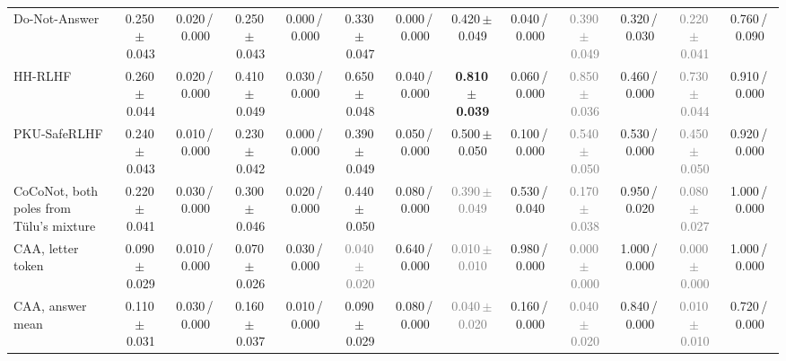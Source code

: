 \begin{tabular}{@{}lcccccccccccc@{}}
Do-Not-Answer & 0.250\,{\scriptsize$\pm$\,0.043} & {\scriptsize 0.020\,/\,0.000} & 0.250\,{\scriptsize$\pm$\,0.043} & {\scriptsize 0.000\,/\,0.000} & 0.330\,{\scriptsize$\pm$\,0.047} & {\scriptsize 0.000\,/\,0.000} & 0.420\,{\scriptsize$\pm$\,0.049} & {\scriptsize 0.040\,/\,0.000} & \textcolor{gray}{0.390\,{\scriptsize$\pm$\,0.049}} & {\scriptsize 0.320\,/\,0.030} & \textcolor{gray}{0.220\,{\scriptsize$\pm$\,0.041}} & {\scriptsize 0.760\,/\,0.090} \\
HH-RLHF & 0.260\,{\scriptsize$\pm$\,0.044} & {\scriptsize 0.020\,/\,0.000} & 0.410\,{\scriptsize$\pm$\,0.049} & {\scriptsize 0.030\,/\,0.000} & 0.650\,{\scriptsize$\pm$\,0.048} & {\scriptsize 0.040\,/\,0.000} & \textbf{0.810\,{\scriptsize$\pm$\,0.039}} & {\scriptsize 0.060\,/\,0.000} & \textcolor{gray}{0.850\,{\scriptsize$\pm$\,0.036}} & {\scriptsize 0.460\,/\,0.000} & \textcolor{gray}{0.730\,{\scriptsize$\pm$\,0.044}} & {\scriptsize 0.910\,/\,0.000} \\
PKU-SafeRLHF & 0.240\,{\scriptsize$\pm$\,0.043} & {\scriptsize 0.010\,/\,0.000} & 0.230\,{\scriptsize$\pm$\,0.042} & {\scriptsize 0.000\,/\,0.000} & 0.390\,{\scriptsize$\pm$\,0.049} & {\scriptsize 0.050\,/\,0.000} & 0.500\,{\scriptsize$\pm$\,0.050} & {\scriptsize 0.100\,/\,0.000} & \textcolor{gray}{0.540\,{\scriptsize$\pm$\,0.050}} & {\scriptsize 0.530\,/\,0.000} & \textcolor{gray}{0.450\,{\scriptsize$\pm$\,0.050}} & {\scriptsize 0.920\,/\,0.000} \\
CoCoNot, both poles from T\"ulu's mixture & 0.220\,{\scriptsize$\pm$\,0.041} & {\scriptsize 0.030\,/\,0.000} & 0.300\,{\scriptsize$\pm$\,0.046} & {\scriptsize 0.020\,/\,0.000} & 0.440\,{\scriptsize$\pm$\,0.050} & {\scriptsize 0.080\,/\,0.000} & \textcolor{gray}{0.390\,{\scriptsize$\pm$\,0.049}} & {\scriptsize 0.530\,/\,0.040} & \textcolor{gray}{0.170\,{\scriptsize$\pm$\,0.038}} & {\scriptsize 0.950\,/\,0.020} & \textcolor{gray}{0.080\,{\scriptsize$\pm$\,0.027}} & {\scriptsize 1.000\,/\,0.000} \\
CAA, letter token & 0.090\,{\scriptsize$\pm$\,0.029} & {\scriptsize 0.010\,/\,0.000} & 0.070\,{\scriptsize$\pm$\,0.026} & {\scriptsize 0.030\,/\,0.000} & \textcolor{gray}{0.040\,{\scriptsize$\pm$\,0.020}} & {\scriptsize 0.640\,/\,0.000} & \textcolor{gray}{0.010\,{\scriptsize$\pm$\,0.010}} & {\scriptsize 0.980\,/\,0.000} & \textcolor{gray}{0.000\,{\scriptsize$\pm$\,0.000}} & {\scriptsize 1.000\,/\,0.000} & \textcolor{gray}{0.000\,{\scriptsize$\pm$\,0.000}} & {\scriptsize 1.000\,/\,0.000} \\
CAA, answer mean & 0.110\,{\scriptsize$\pm$\,0.031} & {\scriptsize 0.030\,/\,0.000} & 0.160\,{\scriptsize$\pm$\,0.037} & {\scriptsize 0.010\,/\,0.000} & 0.090\,{\scriptsize$\pm$\,0.029} & {\scriptsize 0.080\,/\,0.000} & \textcolor{gray}{0.040\,{\scriptsize$\pm$\,0.020}} & {\scriptsize 0.160\,/\,0.000} & \textcolor{gray}{0.040\,{\scriptsize$\pm$\,0.020}} & {\scriptsize 0.840\,/\,0.000} & \textcolor{gray}{0.010\,{\scriptsize$\pm$\,0.010}} & {\scriptsize 0.720\,/\,0.000} \\

\end{tabular}
